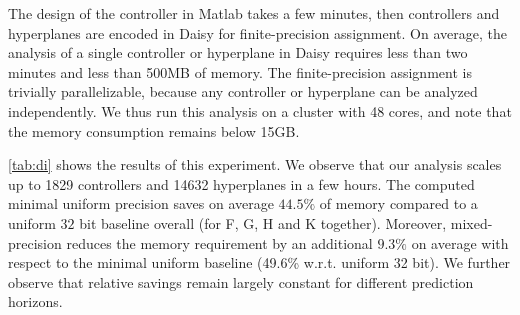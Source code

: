 The design of the controller in Matlab takes a few minutes, then controllers and
hyperplanes are encoded in Daisy for finite-precision assignment. On average, the
analysis of a single controller or hyperplane in Daisy requires less than two
minutes and less than 500MB of memory. The finite-precision assignment is trivially parallelizable, 
because any controller or hyperplane can be analyzed independently.
We thus run this analysis on a cluster with 48 cores, and note that the 
memory consumption remains below 15GB. 


\autoref{tab:di} shows the results of this experiment.
We observe that our analysis scales up to 1829 controllers and 14632 hyperplanes in a few hours.  The computed minimal uniform precision saves on average $44.5\%$ of memory
compared to a uniform $32$ bit baseline overall (for F, G, H and K together). 
Moreover, mixed-precision reduces the memory requirement by an additional
$9.3\%$ on average with respect to the minimal uniform baseline (49.6\% w.r.t. uniform 32 bit).
We further observe that relative savings remain largely constant for different 
prediction horizons.
